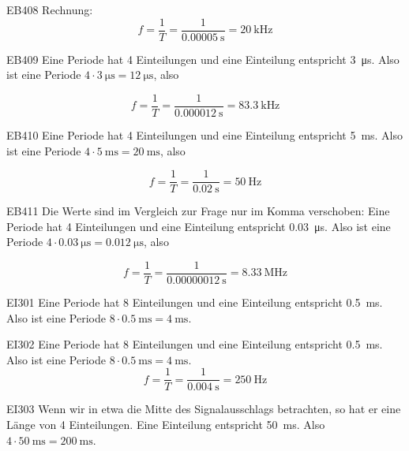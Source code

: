 \begin{sol}{EB408}
    Rechnung: 
  $$ f = \frac{1}{T}  = \frac{1}{\SI{0.00005}{\second}} = \SI{20}{\kilo\hertz}$$
\end{sol}


\begin{sol}{EB409}
    Eine Periode hat 4 Einteilungen und eine Einteilung entspricht \SI{3}{\micro\second}. Also ist eine Periode $4\cdot \SI{3}{\micro\second} = \SI{12}{\micro\second}$, also

  $$ f = \frac{1}{T}  = \frac{1}{\SI{0.000012}{\second}} = \SI{83,3}{\kilo\hertz}$$
\end{sol}


\begin{sol}{EB410}
    Eine Periode hat 4 Einteilungen und eine Einteilung entspricht \SI{5}{\milli\second}. Also ist eine Periode $4\cdot \SI{5}{\milli\second} = \SI{20}{\milli\second}$, also

  $$ f = \frac{1}{T}  = \frac{1}{\SI{0.02}{\second}} = \SI{50}{\hertz}$$
\end{sol}

\begin{sol}{EB411}
    Die Werte sind im Vergleich zur Frage  nur im Komma verschoben:
    Eine Periode hat 4 Einteilungen und eine Einteilung entspricht \SI{0,03}{\micro\second}. Also ist eine Periode $4\cdot \SI{0,03}{\micro\second} = \SI{0,012}{\micro\second}$, also

  $$ f = \frac{1}{T}  = \frac{1}{\SI{0.00000012}{\second}} = \SI{8,33}{\mega\hertz}$$
\end{sol}





\begin{sol}{EI301}    
    Eine Periode hat 8 Einteilungen und eine Einteilung entspricht \SI{0,5}{\milli\second}. Also ist eine Periode $8\cdot \SI{0,5}{\milli\second} = \SI{4}{\milli\second}$.
\end{sol}


\begin{sol}{EI302}    
    Eine Periode hat 8 Einteilungen und eine Einteilung entspricht \SI{0,5}{\milli\second}. Also ist eine Periode $8\cdot \SI{0,5}{\milli\second} = \SI{4}{\milli\second}$.
 $$ f = \frac{1}{T}  = \frac{1}{\SI{0.004}{\second}} = \SI{250}{\hertz}$$
\end{sol}


\begin{sol}{EI303}    
    Wenn wir in etwa die Mitte des Signalausschlags betrachten, so hat er eine Länge von 4 Einteilungen.
   Eine Einteilung entspricht \SI{50}{\milli\second}. Also $4\cdot \SI{50}{\milli\second} = \SI{200}{\milli\second}$.
 \end{sol}

